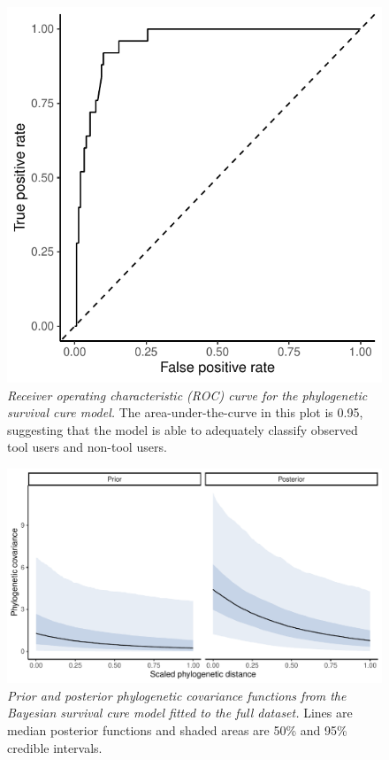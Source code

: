 \documentclass[
  man, donotrepeattitle,floatsintext]{apa6}
\begin{document}
\begin{figure}
\centering
\includegraphics{manuscript_files/figure-latex/plotSurvCure9-1.pdf}
\caption{\label{fig:plotSurvCure9}\emph{Receiver operating characteristic (ROC) curve for the phylogenetic survival cure model.} The area-under-the-curve in this plot is 0.95, suggesting that the model is able to adequately classify observed tool users and non-tool users.}
\end{figure}

\newpage



\begin{figure}
\centering
\includegraphics{manuscript_files/figure-latex/plotSurvCure5-1.pdf}
\caption{\label{fig:plotSurvCure5}\emph{Prior and posterior phylogenetic covariance functions from the Bayesian survival cure model fitted to the full dataset.} Lines are median posterior functions and shaded areas are 50\% and 95\% credible intervals.}
\end{figure}
\end{document}

